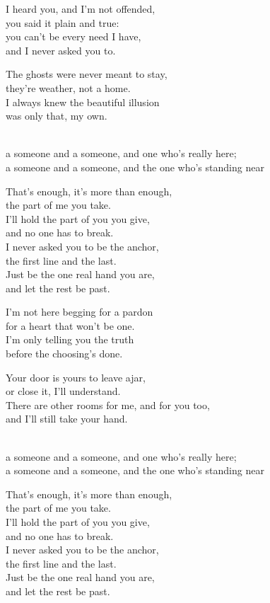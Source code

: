 \begin{lyrics}
I heard you, and I'm not offended,\\
you said it plain and true:\\
you can't be every need I have,\\
and I never asked you to.

The ghosts were never meant to stay,\\
they're weather, not a home.\\
I always knew the beautiful illusion\\
was only that, my own.

\\
a someone and a someone, and one who's really here;\\
a someone and a someone, and the one who's standing near

That's enough, it's more than enough,\\
the part of me you take.\\
I'll hold the part of you you give,\\
and no one has to break.\\
I never asked you to be the anchor,\\
the first line and the last.\\
Just be the one real hand you are,\\
and let the rest be past.

I'm not here begging for a pardon\\
for a heart that won't be one.\\
I'm only telling you the truth\\
before the choosing's done.

Your door is yours to leave ajar,\\
or close it, I'll understand.\\
There are other rooms for me, and for you too,\\
and I'll still take your hand.

\\
a someone and a someone, and one who's really here;\\
a someone and a someone, and the one who's standing near

That's enough, it's more than enough,\\
the part of me you take.\\
I'll hold the part of you you give,\\
and no one has to break.\\
I never asked you to be the anchor,\\
the first line and the last.\\
Just be the one real hand you are,\\
and let the rest be past.


\end{lyrics}
